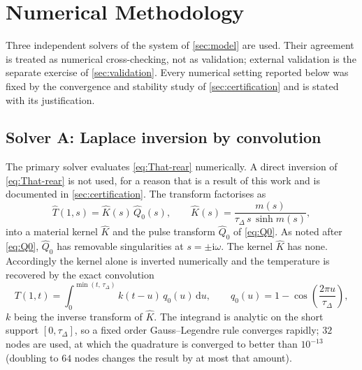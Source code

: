 \documentclass[preprint,12pt,a4paper]{elsarticle}
\theoremstyle{plain}
\theoremstyle{definition}
\theoremstyle{remark}
\begin{document}
\section{Numerical Methodology}
\label{sec:methods}

Three independent solvers of the system of \cref{sec:model} are used. Their
agreement is treated as numerical cross-checking, not as validation; external
validation is the separate exercise of \cref{sec:validation}. Every numerical
setting reported below was fixed by the convergence and stability study of
\cref{sec:certification} and is stated with its justification.

\subsection{Solver A: Laplace inversion by convolution}
\label{sec:methods-laplace}

The primary solver evaluates \eqref{eq:That-rear} numerically. A direct
inversion of \eqref{eq:That-rear} is not used, for a reason that is a result of
this work and is documented in \cref{sec:certification}. The transform
factorises as
%
\begin{equation}
  \hat{T}(1,s) = \hat{K}(s)\,\hat{Q}_{0}(s) ,
  \qquad
  \hat{K}(s) = \frac{m(s)}{\tau_{\Delta}\, s\, \sinh m(s)} ,
  \label{eq:factorisation}
\end{equation}
%
into a material kernel $\hat{K}$ and the pulse transform $\hat{Q}_{0}$ of
\eqref{eq:Q0}. As noted after \eqref{eq:Q0}, $\hat{Q}_{0}$ has removable
singularities at $s = \pm\mathrm{i}\omega$. The kernel $\hat{K}$ has none.
Accordingly the kernel alone is inverted numerically and the temperature is
recovered by the exact convolution
%
\begin{equation}
  T(1,t) = \int_{0}^{\min(t,\,\tau_{\Delta})}
           k(t-u)\, q_{0}(u)\, \mathrm{d}u ,
  \qquad
  q_{0}(u) = 1 - \cos\!\left(\frac{2\pi u}{\tau_{\Delta}}\right),
  \label{eq:convolution}
\end{equation}
%
$k$ being the inverse transform of $\hat{K}$. The integrand is analytic on the
short support $[0,\tau_{\Delta}]$, so a fixed order Gauss--Legendre rule
converges rapidly; $32$ nodes are used, at which the quadrature is converged to
better than $10^{-13}$ (doubling to $64$ nodes changes the result by at most
that amount).
\end{document}
